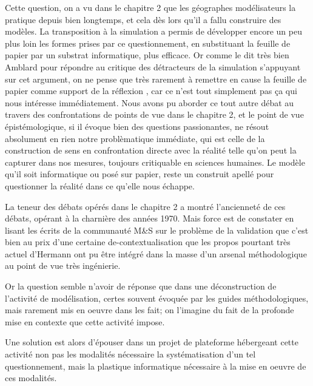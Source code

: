 
Cette question, on a vu dans le chapitre 2 que les géographes modélisateurs la pratique depuis bien longtemps, et cela dès lors qu'il a fallu construire des modèles. La transposition à la simulation a permis de développer encore un peu plus loin les formes prises par ce questionnement, en substituant la feuille de papier par un substrat informatique, plus efficace. Or comme le dit très bien Amblard pour répondre au critique des détracteurs de la simulation s'appuyant sur cet argument, on ne pense que très rarement à remettre en cause la feuille de papier comme support de la réflexion , car ce n'est tout simplement pas ça qui nous intéresse immédiatement. Nous avons pu aborder ce tout autre débat au travers des confrontations de points de vue dans le chapitre 2, et le point de vue épistémologique, si il évoque bien des questions passionantes, ne résout absolument en rien notre problèmatique immédiate, qui est celle de la construction de sens en confrontation directe avec la réalité telle qu'on peut la capturer dans nos mesures, toujours critiquable en sciences humaines. Le modèle qu'il soit informatique ou posé sur papier, reste un construit apellé pour questionner la réalité dans ce qu'elle nous échappe. 

La teneur des débats opérés dans le chapitre 2 a montré l'ancienneté de ces débats, opérant à la charnière des années 1970. Mais force est de constater en lisant les écrits de la communauté M\&S sur le problème de la validation que c'est bien au prix d'une certaine de-contextualisation que les propos pourtant très actuel d'Hermann ont pu être intégré dans la masse d'un arsenal méthodologique au point de vue très ingénierie.

Or la question semble n'avoir de réponse que dans une déconstruction de l'activité de modélisation, certes souvent évoquée par les guides méthodologiques, mais rarement mis en oeuvre dans les fait; on l'imagine du fait de la profonde mise en contexte que cette activité impose.

Une solution est alors d'épouser dans un projet de plateforme hébergeant cette activité non pas les modalités nécessaire la systématisation d'un tel questionnement, mais la plastique informatique nécessaire à la mise en oeuvre de ces modalités. 

